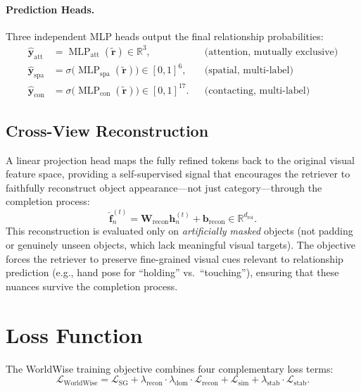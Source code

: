 \documentclass{article}
\newcommand{\mR}{\mathbb{R}}
\newcommand{\op}[1]{\operatorname{#1}}
\newcommand{\mat}[1]{\bm{#1}}
\begin{document}
\paragraph{Prediction Heads.}  Three independent MLP heads output the final relationship probabilities:
\begin{align}
    \hat{\mat{y}}_{\text{att}} &= \op{MLP}_{\text{att}}(\tilde{\mat{r}}) \in \mR^{3}, & &\text{(attention, mutually exclusive)} \label{eq:att_head} \\
    \hat{\mat{y}}_{\text{spa}} &= \sigma\!\bigl(\op{MLP}_{\text{spa}}(\tilde{\mat{r}})\bigr) \in [0,1]^{6}, & &\text{(spatial, multi-label)} \label{eq:spa_head} \\
    \hat{\mat{y}}_{\text{con}} &= \sigma\!\bigl(\op{MLP}_{\text{con}}(\tilde{\mat{r}})\bigr) \in [0,1]^{17}. & &\text{(contacting, multi-label)} \label{eq:con_head}
\end{align}

\subsection{Cross-View Reconstruction}

A linear projection head maps the fully refined tokens back to the original visual feature space, providing a self-supervised signal that encourages the retriever to faithfully reconstruct object appearance---not just category---through the completion process:
\begin{equation}
    \hat{\mat{f}}_n^{(t)} = \mat{W}_{\text{recon}} \mat{h}_n^{(t)} + \mat{b}_{\text{recon}} \in \mR^{d_{\text{roi}}}.
    \label{eq:recon}
\end{equation}
This reconstruction is evaluated only on \emph{artificially masked} objects (not padding or genuinely unseen objects, which lack meaningful visual targets).  The objective forces the retriever to preserve fine-grained visual cues relevant to relationship prediction (e.g., hand pose for ``holding'' vs.\ ``touching''), ensuring that these nuances survive the completion process.

\section{Loss Function}
\label{sec:loss}

The WorldWise training objective combines four complementary loss terms:
\begin{equation}
    \mathcal{L}_{\text{WorldWise}} = \mathcal{L}_{\text{SG}} + \lambda_{\text{recon}} \cdot \lambda_{\text{dom}} \cdot \mathcal{L}_{\text{recon}} + \mathcal{L}_{\text{sim}} + \lambda_{\text{stab}} \cdot \mathcal{L}_{\text{stab}}.
    \label{eq:total_loss}
\end{equation}
\end{document}
